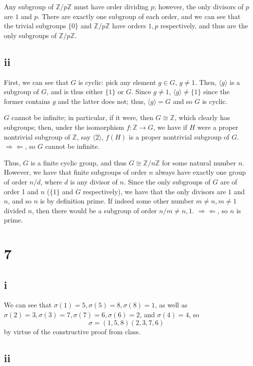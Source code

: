 \documentclass[12pt,letterpaper]{article}
\theoremstyle{definition}
\newcommand{\contra}{\Rightarrow\!\Leftarrow}
\newcommand{\Z}{\mathbb{Z}}
\begin{document}
Any subgroup of $\Z/p\Z$ must have order dividing $p$; however, the only divisors of $p$ are $1$ and $p$. There are exactly one subgroup of each order, and we can see that the trivial subgroups $\{0\}$ and $\Z/p\Z$ have orders $1, p$ respectively, and thus are the only subgroups of $\Z/p\Z$.

\subsection*{ii}

First, we can see that $G$ is cyclic: pick any element $g \in G$, $g \neq 1$. Then, $\langle g \rangle$ is a subgroup of $G$, and is thus either $\{1\}$ or $G$. Since $g \neq 1$, $\langle g \rangle \neq \{1\}$ since the former contains $g$ and the latter does not; thus, $\langle g \rangle = G$ and so $G$ is cyclic.

$G$ cannot be infinite; in particular, if it were, then $G \cong \Z$, which clearly has subgroups; then, under the isomorphism $f: \Z \rightarrow G$, we have if $H$ were a proper nontrivial subgroup of $\Z$, say $\langle 2 \rangle$, $f(H)$ is a proper nontrivial subgroup of $G$. $\contra$, so $G$ cannot be infinite.

Thus, $G$ is a finite cyclic group, and thus $G \cong \Z/n\Z$ for some natural number $n$. However, we have that finite subgroups of order $n$ always have exactly one group of order $n/d$, where $d$ is any divisor of $n$. Since the only subgroups of $G$ are of order 1 and $n$ ($\{1\}$ and $G$ respectively), we have that the only divisors are $1$ and $n$, and so $n$ is by definition prime. If indeed some other number $m \neq n, m \neq 1$ divided $n$, then there would be a subgroup of order $n/m \neq n, 1$. $\contra$, so $n$ is prime.

\section*{7}

\subsection*{i}

We can see that $\sigma(1) = 5, \sigma(5) = 8, \sigma(8) = 1$, as well as $\sigma(2) = 3, \sigma(3) = 7, \sigma(7) = 6, \sigma(6) = 2$, and $\sigma(4) = 4$, so
\[
  \sigma = (1,5,8)(2,3,7,6)
\]
by virtue of the constructive proof from class.

\subsection*{ii}
\end{document}
